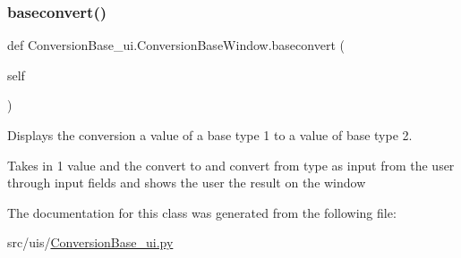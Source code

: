 \subsubsection{\texorpdfstring{baseconvert()}{baseconvert()}}
{\footnotesize\ttfamily def Conversion\+Base\+\_\+ui.\+Conversion\+Base\+Window.\+baseconvert (\begin{DoxyParamCaption}\item[{}]{self }\end{DoxyParamCaption})}



Displays the conversion a value of a base type 1 to a value of base type 2. 

Takes in 1 value and the convert to and convert from type as input from the user through input fields and shows the user the result on the window 

The documentation for this class was generated from the following file\+:\begin{DoxyCompactItemize}
\item 
src/uis/\hyperlink{_conversion_base__ui_8py}{Conversion\+Base\+\_\+ui.\+py}\end{DoxyCompactItemize}
